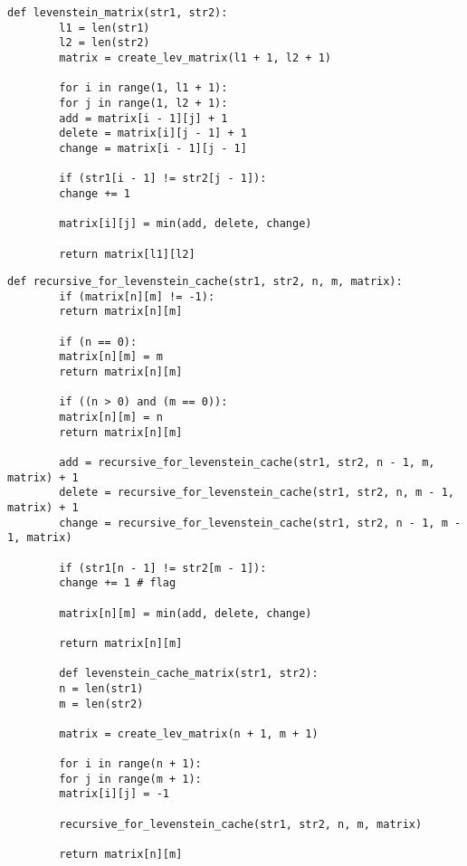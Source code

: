 \begin{center}
	\captionsetup{justification=raggedright,singlelinecheck=off}
	\begin{lstlisting}[label=lst:lev_mat,caption=Алгоритм нахождения расстояния Левенштейна (матричный)]
		def levenstein_matrix(str1, str2):
		l1 = len(str1)
		l2 = len(str2)
		matrix = create_lev_matrix(l1 + 1, l2 + 1)
		
		for i in range(1, l1 + 1):
		for j in range(1, l2 + 1):
		add = matrix[i - 1][j] + 1
		delete = matrix[i][j - 1] + 1
		change = matrix[i - 1][j - 1]
		
		if (str1[i - 1] != str2[j - 1]):
		change += 1
		
		matrix[i][j] = min(add, delete, change)
		
		return matrix[l1][l2]
	\end{lstlisting}
\end{center}


\begin{center}
	\captionsetup{justification=raggedright,singlelinecheck=off}
	\begin{lstlisting}[label=lst:lev_cach,caption=Алгоритм нахождения расстояния Левенштейна c использованием кеша в виде матрицы]
		def recursive_for_levenstein_cache(str1, str2, n, m, matrix):
		if (matrix[n][m] != -1):
		return matrix[n][m]
		
		if (n == 0):
		matrix[n][m] = m
		return matrix[n][m]
		
		if ((n > 0) and (m == 0)):
		matrix[n][m] = n
		return matrix[n][m]
		
		add = recursive_for_levenstein_cache(str1, str2, n - 1, m, matrix) + 1
		delete = recursive_for_levenstein_cache(str1, str2, n, m - 1, matrix) + 1
		change = recursive_for_levenstein_cache(str1, str2, n - 1, m - 1, matrix)
		
		if (str1[n - 1] != str2[m - 1]):
		change += 1 # flag
		
		matrix[n][m] = min(add, delete, change)
		
		return matrix[n][m]
		
		def levenstein_cache_matrix(str1, str2):
		n = len(str1)
		m = len(str2)
		
		matrix = create_lev_matrix(n + 1, m + 1)
		
		for i in range(n + 1):
		for j in range(m + 1):
		matrix[i][j] = -1
		
		recursive_for_levenstein_cache(str1, str2, n, m, matrix)
		
		return matrix[n][m]
	\end{lstlisting}
\end{center}



